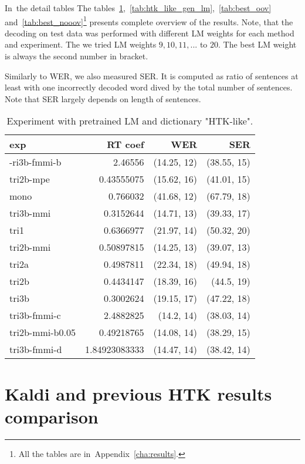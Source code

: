 In~the detail tables 
The tables~\ref{tab:htk_like},~\ref{tab:htk_like_gen_lm},~\ref{tab:best_oov} 
and~\ref{tab:best_nooov}\footnote{All the tables are in~Appendix~\ref{cha:results}.} presents complete overview of the results. 
Note, that the decoding on test data was performed with different \ac{LM} weights for each method and 
experiment. The we tried \ac{LM} weights $9, 10, 11, ...$ to $20$. 
The best \ac{LM} weight is always the second number in bracket.

Similarly to \ac{WER}, we also measured \ac{SER}. It is computed as ratio of sentences at least with one incorrectly decoded word dived by the total number of sentences. Note that \ac{SER} largely depends on length of sentences. 

\begin{table}[!htp]\label{tab:htk_like}\centering\begin{tabular}{l|rrr}
exp             & RT coef       & WER         & SER        \\ 
\hline
-ri3b-fmmi-b    & 2.46556       & (14.25, 12) & (38.55, 15)\\ 
tri2b-mpe       & 0.43555075    & (15.62, 16) & (41.01, 15)\\ 
mono            & 0.766032      & (41.68, 12) & (67.79, 18)\\ 
tri3b-mmi       & 0.3152644     & (14.71, 13) & (39.33, 17)\\ 
tri1            & 0.6366977     & (21.97, 14) & (50.32, 20)\\ 
tri2b-mmi       & 0.50897815    & (14.25, 13) & (39.07, 13)\\ 
tri2a           & 0.4987811     & (22.34, 18) & (49.94, 18)\\ 
tri2b           & 0.4434147     & (18.39, 16) & (44.5, 19) \\ 
tri3b           & 0.3002624     & (19.15, 17) & (47.22, 18)\\ 
tri3b-fmmi-c    & 2.4882825     & (14.2, 14)  & (38.03, 14)\\ 
tri2b-mmi-b0.05 & 0.49218765    & (14.08, 14) & (38.29, 15)\\ 
tri3b-fmmi-d    & 1.84923083333 & (14.47, 14) & (38.42, 14)
\end{tabular}
\caption{Experiment with pretrained LM and dictionary "\ac{HTK}-like".}
\end{table}  


\section[Kaldi and \ac{HTK}]{Kaldi and previous \ac{HTK} results comparison} 
\label{sec:compare}

